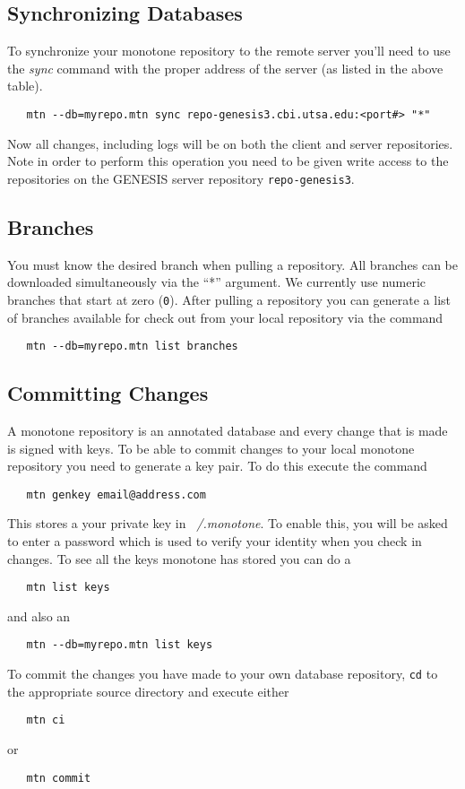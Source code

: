\documentclass[12pt]{article}
\begin{document}
\subsection*{Synchronizing Databases}

To synchronize your monotone repository to the remote server you'll need to use the {\it sync} command with the proper address of the server (as listed in the above table).
\begin{verbatim}
   mtn --db=myrepo.mtn sync repo-genesis3.cbi.utsa.edu:<port#> "*" 
\end{verbatim}
Now all changes, including logs will be on both the client and server repositories. Note in order to perform this operation you need to be given write access to the repositories on the GENESIS server repository {\tt repo-genesis3}.

\subsection*{Branches}

You must know the desired branch when pulling a repository. All branches can be downloaded simultaneously via the ``*'' argument. We currently use numeric branches that start at zero ({\tt 0}). After pulling a repository you can generate a list of branches available for check out from your local repository via the command
\begin{verbatim}
   mtn --db=myrepo.mtn list branches 
\end{verbatim}

\subsection*{Committing Changes}

A monotone repository is an annotated database and every change that is made is signed with keys. To be able to commit changes to your local monotone repository you need to generate a key pair. To do this execute the command
\begin{verbatim}
   mtn genkey email@address.com 
\end{verbatim}
This stores a your private key in {\it ~/.monotone}. To enable this, you will be asked to enter a password which is used to verify your identity when you check in changes. To see all the keys monotone has stored you can do a
\begin{verbatim}
   mtn list keys 
\end{verbatim}
and also an
\begin{verbatim}
   mtn --db=myrepo.mtn list keys 
\end{verbatim}
To commit the changes you have made to your own database repository, {\tt cd} to the appropriate source directory and execute either
\begin{verbatim}
   mtn ci
\end{verbatim}
or
\begin{verbatim}
   mtn commit 
\end{verbatim}
\end{document}
